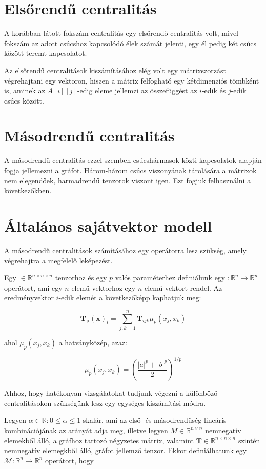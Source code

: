\documentclass[12pt,numbers=noenddot]{report}
\begin{document}
\section{Elsőrendű centralitás}

A korábban látott fokszám centralitás egy elsőrendő centralitás volt,
mivel fokszám az adott csúcshoz kapcsolódó élek számát jelenti,
egy él pedig két csúcs között teremt kapcsolatot. 

Az elsőrendű centralitások kiszámításához elég volt egy mátrixszorzást 
végrehajtani egy vektoron, hiszen a mátrix felfogható egy kétdimenziós tömbként
is, aminek az $A[i][j]$-edig eleme jellemzi az összefüggést az $i$-edik és 
$j$-edik csúcs között.


\section{Másodrendű centralitás}

A másodrendű centralitás ezzel szemben csúcshármasok közti kapcsolatok alapján 
fogja jellemezni a gráfot. Három-három csúcs viszonyának tárolására a mátrixok 
nem elegendőek, harmadrendű tenzorok viszont igen.
Ezt fogjuk felhasználni a következőkben.


\section{Általános sajátvektor modell}

A másodrendű centralitások számításához egy operátorra lesz szükség, 
amely végrehajtra a megfelelő leképezést.

Egy \unboldmath $\in \mathbb{R}^{n \times n \times n}$ 
tenzorhoz és egy $p$ valós paraméterhez definiálunk egy 
\unboldmath $: \mathbb{R}^n \rightarrow \mathbb{R}^n$ operátort,
ami egy $n$ elemű vektorhoz egy $n$ elemű vektort rendel. 
Az eredményvektor $i$-edik elemét a következőképp kaphatjuk meg:

$$\boldsymbol{T_p}(\boldsymbol{x})_i = \sum_{j,k=1}^n \boldsymbol{T}_{ijk} 
\mu_p(x_j,x_k)$$

ahol $\mu_p(x_j,x_k)$ a hatványközép, azaz:

$$\mu_p(x_j,x_k) = \left(\frac{|a|^p+|b|^p}{2}\right)^{1/p}$$


Ahhoz, hogy hatékonyan vizsgálatokat tudjunk végezni a különböző 
centralitásokon szükségünk lesz egy egységes kiszámítási módra.

Legyen $\alpha \in \mathbb{R}: 0 \leq \alpha \leq 1$ skalár, ami az első- 
és másodrendűség lineáris kombinációjának az arányát adja meg,
illetve legyen $M \in \mathbb{R}^{n \times n}$ nemnegatív elemekből álló, 
a gráfhoz tartozó négyzetes mátrix, valamint $\boldsymbol{T} \in 
\mathbb{R}^{n \times n \times n}$ szintén nemnegatív elemegkből álló, 
gráfot jellemző tenzor. Ekkor definiálhatunk egy $\mathcal{M}: 
\mathbb{R}^n \rightarrow \mathbb{R}^n$ operátort, hogy
\end{document}
